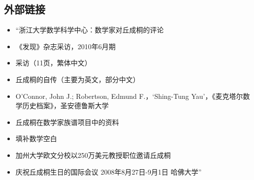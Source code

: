\subsection{外部链接}
\begin{itemize}
\item “浙江大学数学科学中心：数学家对丘成桐的评论  
\item 《发现》杂志采访，2010年6月期  
\item 采访（11页，繁体中文）  
\item 丘成桐的自传（主要为英文，部分中文）  
\item O'Connor, John J.; Robertson, Edmund F.，‘Shing-Tung Yau’，《麦克塔尔数学历史档案》，圣安德鲁斯大学  
\item 丘成桐在数学家族谱项目中的资料  
\item 填补数学空白  
\item 加州大学欧文分校以250万美元教授职位邀请丘成桐  
\item 庆祝丘成桐生日的国际会议 2008年8月27日-9月1日 哈佛大学”
\end{itemize}